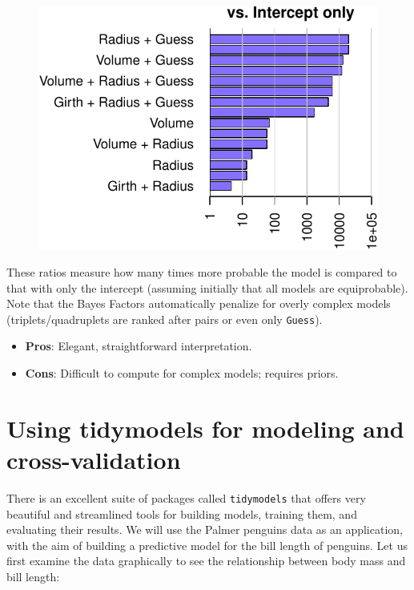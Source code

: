 \documentclass[
  letterpaper,
  DIV=11,
  numbers=noendperiod]{scrreprt}
\providecommand{\tightlist}{%
  \setlength{\itemsep}{0pt}\setlength{\parskip}{0pt}}\usepackage{longtable,booktabs,array}
\begin{document}
\begin{figure}[H]

{\centering \includegraphics{./10-model_selection_files/figure-pdf/unnamed-chunk-22-1.pdf}

}

\end{figure}

These ratios measure how many times more probable the model is compared
to that with only the intercept (assuming initially that all models are
equiprobable). Note that the Bayes Factors automatically penalize for
overly complex models (triplets/quadruplets are ranked after pairs or
even only \texttt{Guess}).

\begin{itemize}
\tightlist
\item
  \textbf{Pros}: Elegant, straightforward interpretation.
\item
  \textbf{Cons}: Difficult to compute for complex models; requires
  priors.
\end{itemize}

\hypertarget{using-tidymodels-for-modeling-and-cross-validation}{%
\section{Using tidymodels for modeling and
cross-validation}\label{using-tidymodels-for-modeling-and-cross-validation}}

There is an excellent suite of packages called \texttt{tidymodels} that
offers very beautiful and streamlined tools for building models,
training them, and evaluating their results. We will use the Palmer
penguins data as an application, with the aim of building a predictive
model for the bill length of penguins. Let us first examine the data
graphically to see the relationship between body mass and bill length:
\end{document}
